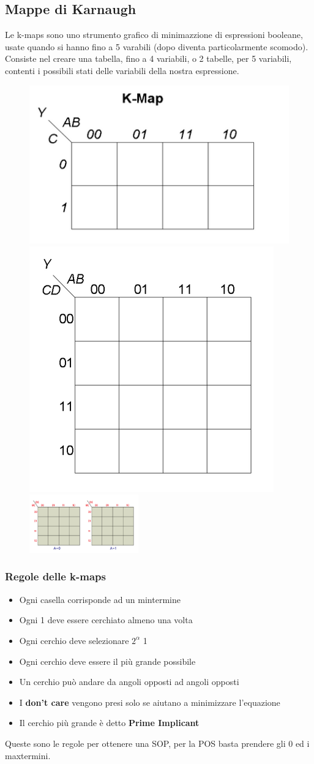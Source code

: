 \documentclass{report}
\begin{document}
    \subsection{Mappe di Karnaugh}
        Le k-maps sono uno strumento grafico di minimazzione di espressioni booleane, 
        usate quando si hanno fino a 5 varabili (dopo diventa particolarmente scomodo). \\
        Consiste nel creare una tabella, fino a 4 variabili, o 2 tabelle, per 5 variabili,
        contenti i possibili stati delle variabili della nostra espressione.
        \begin{center}
                \begin{figure}[H]
                    \includegraphics[width=.3\textwidth]{k1.png}\hfill
                    \includegraphics[width=.3\textwidth]{k2.png}\hfill
                    \includegraphics[width=.3\textwidth, height = 2.5cm]{k3.png}
                \end{figure}
        \end{center}
        \subsubsection{Regole delle k-maps}
        \begin{itemize}
            \item Ogni casella corrisponde ad un mintermine
            \item Ogni 1 deve essere cerchiato almeno una volta
            \item Ogni cerchio deve selezionare $2^\alpha$ 1
            \item Ogni cerchio deve essere il più grande possibile
            \item Un cerchio può andare da angoli opposti ad angoli opposti
            \item I \textbf{don't care} vengono presi solo se aiutano a minimizzare l'equazione
            \item Il cerchio più grande è detto \textbf{Prime Implicant}
        \end{itemize}
            Queste sono le regole per ottenere una SOP, per la POS basta prendere gli 0 ed i maxtermini.
            
\end{document}
